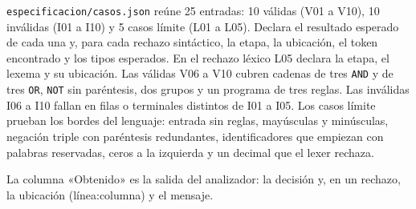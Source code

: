 \documentclass[11pt,a4paper]{article}
\newcommand{\tk}[1]{\texttt{#1}}
\begin{document}
\texttt{especificacion/casos.json} reúne 25 entradas: 10 válidas (V01
a V10), 10 inválidas (I01 a I10) y 5 casos límite (L01 a L05).
Declara el resultado esperado de cada una y, para cada rechazo
sintáctico, la etapa, la ubicación, el token encontrado y los tipos
esperados. En el rechazo léxico L05 declara la etapa, el lexema y su
ubicación. Las
válidas V06 a V10 cubren cadenas de tres \tk{AND} y de tres \tk{OR},
\tk{NOT} sin paréntesis, dos grupos y un programa de tres reglas. Las
inválidas I06 a I10 fallan en filas o terminales distintos de I01 a
I05. Los casos límite prueban los bordes del lenguaje: entrada sin
reglas, mayúsculas y minúsculas, negación triple con paréntesis
redundantes, identificadores que empiezan con palabras reservadas,
ceros a la izquierda y un decimal que el lexer rechaza.

La columna «Obtenido» es la salida del analizador: la decisión y, en
un rechazo, la ubicación (línea:columna) y el mensaje.
\end{document}
